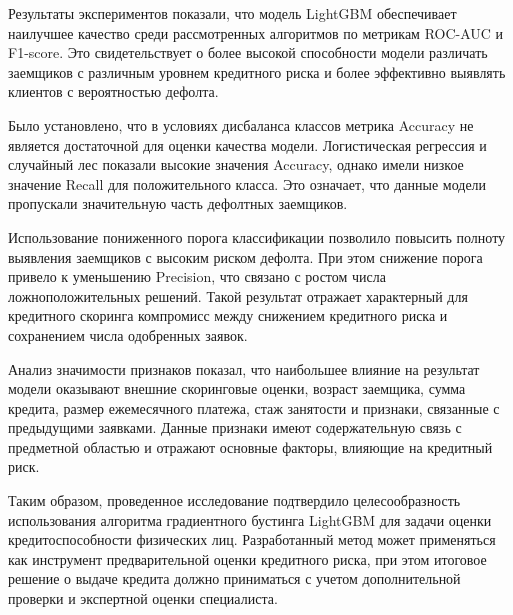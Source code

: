 Результаты экспериментов показали, что модель LightGBM обеспечивает наилучшее качество среди рассмотренных алгоритмов по метрикам ROC-AUC и F1-score. Это свидетельствует о более высокой способности модели различать заемщиков с различным уровнем кредитного риска и более эффективно выявлять клиентов с вероятностью дефолта.

Было установлено, что в условиях дисбаланса классов метрика Accuracy не является достаточной для оценки качества модели. Логистическая регрессия и случайный лес показали высокие значения Accuracy, однако имели низкое значение Recall для положительного класса. Это означает, что данные модели пропускали значительную часть дефолтных заемщиков.

Использование пониженного порога классификации позволило повысить полноту выявления заемщиков с высоким риском дефолта. При этом снижение порога привело к уменьшению Precision, что связано с ростом числа ложноположительных решений. Такой результат отражает характерный для кредитного скоринга компромисс между снижением кредитного риска и сохранением числа одобренных заявок.

Анализ значимости признаков показал, что наибольшее влияние на результат модели оказывают внешние скоринговые оценки, возраст заемщика, сумма кредита, размер ежемесячного платежа, стаж занятости и признаки, связанные с предыдущими заявками. Данные признаки имеют содержательную связь с предметной областью и отражают основные факторы, влияющие на кредитный риск.

Таким образом, проведенное исследование подтвердило целесообразность использования алгоритма градиентного бустинга LightGBM для задачи оценки кредитоспособности физических лиц. Разработанный метод может применяться как инструмент предварительной оценки кредитного риска, при этом итоговое решение о выдаче кредита должно приниматься с учетом дополнительной проверки и экспертной оценки специалиста.